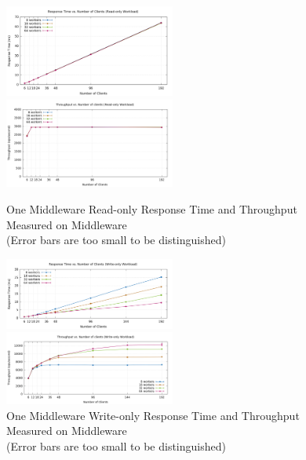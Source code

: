 \begin{figure}[!h]
\parbox{.5\linewidth}{
\centering
\includegraphics[width=0.5\textwidth]{img/3_1_responsetime_readonly_mw.png}
}
\parbox{.5\linewidth}{
\centering
\includegraphics[width=0.5\textwidth]{img/3_1_throughput_readonly_mw.png}
}
\captionsetup{justification=centering}
\caption{\label{fig:3.1readonly_mw}One Middleware Read-only Response Time and Throughput Measured on Middleware \\(Error bars are too small to be distinguished)}

\parbox{.5\linewidth}{
\centering
\includegraphics[width=0.5\textwidth]{img/3_1_responsetime_writeonly_mw.png}
}
\parbox{.5\linewidth}{
\centering
\includegraphics[width=0.5\textwidth]{img/3_1_throughput_writeonly_mw.png}
}
\captionsetup{justification=centering}
\caption{\label{fig:3.1writeonly_mw}One Middleware Write-only Response Time and Throughput Measured on Middleware \\(Error bars are too small to be distinguished)}


\end{figure}
